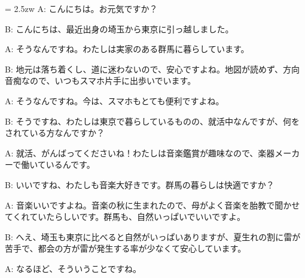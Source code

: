 \documentclass[11pt]{amsart}
\title{}
\author{}
\newenvironment{hangall}[1]{\hangindent = 2.5zw\everypar{\hangindent = 2.5zw}}{}
\begin{document}
\maketitle
\begin{hangall}{}%
A: こんにちは。お元気ですか？



B: こんにちは、最近出身の埼玉から東京に引っ越しました。



A: そうなんですね。わたしは実家のある群馬に暮らしています。



B: 地元は落ち着くし、道に迷わないので、安心ですよね。地図が読めず、方向音痴なので、いつもスマホ片手に出歩いでいます。



A: そうなんですね。今は、スマホもとても便利ですよね。



B: そうですね、わたしは東京で暮らしているものの、就活中なんですが、何をされている方なんですか？



A: 就活、がんばってくださいね！わたしは音楽鑑賞が趣味なので、楽器メーカーで働いているんです。



B: いいですね、わたしも音楽大好きです。群馬の暮らしは快適ですか？



A: 音楽いいですよね。音楽の秋に生まれたので、母がよく音楽を胎教で聞かせてくれていたらしいです。群馬も、自然いっぱいでいいですよ。



B: へえ、埼玉も東京に比べると自然がいっぱいありますが、夏生れの割に雷が苦手で、都会の方が雷が発生する率が少なくて安心しています。



A: なるほど、そういうことですね。\end{hangall}
\end{document}
